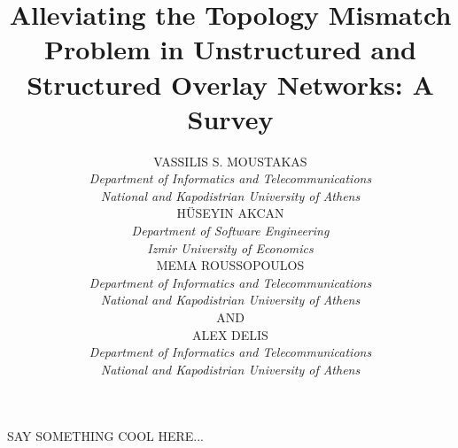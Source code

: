 \documentclass[acmcsur,acmnow]{acmtrans2m}
\title{Alleviating the Topology Mismatch Problem in Unstructured and Structured
Overlay Networks: A Survey}
\author{
VASSILIS S. MOUSTAKAS\\\emph{Department of Informatics and Telecommunications}\\\emph{National and Kapodistrian University of Athens}\\
H\"USEYIN AKCAN\\\emph{Department of Software Engineering}\\\emph{Izmir University of Economics}\\
MEMA ROUSSOPOULOS\\\emph{Department of Informatics and Telecommunications}\\\emph{National and Kapodistrian University of Athens}\\
AND\\
ALEX DELIS\\\emph{Department of Informatics and Telecommunications}\\\emph{National and Kapodistrian University of Athens}\\
}
\begin{document}
\begin{bottomstuff}
SAY SOMETHING COOL HERE...
\end{bottomstuff}

\maketitle



\end{document}
